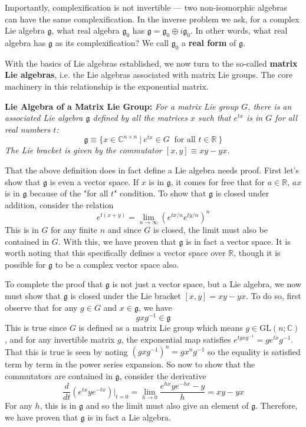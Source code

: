 \documentclass{article}
\renewcommand{\t}[1]{\text{#1}}
\newcommand{\definition}[2]{
	\begin{center}
		\begin{tcolorbox}[colframe=MidnightBlue, colback=black!5, arc=2mm, outer arc=0.5mm, width=\linewidth, left=2mm, right=2mm]
			\textbf{#1:} \emph{#2}	
		\end{tcolorbox}
	\end{center}\noindent}
\newcommand{\sidenote}[1]{
	\marginpar{\raggedright\small\textcolor{Bittersweet}{#1}}
}
\begin{document}
Importantly, complexification is not invertible --- two non-isomorphic algebras can have the same complexification. In the inverse problem we ask, for a complex Lie algebra $\mathfrak{g}$, what real algebra $\mathfrak{g}_0$ has $\mathfrak{g}=\mathfrak{g}_0 \oplus i\mathfrak{g}_0$. In other words, what real algebra has $\mathfrak{g}$ as its complexification? We call $\mathfrak{g}_0$ a \textbf{real form} of $\mathfrak{g}$. 
	

With\sidenote{\textbf{Lie Algebra of a Lie Group}} the basics of Lie algebras established, we now turn to the so-called \textbf{matrix Lie algebras}, i.e. the Lie algebras associated with matrix Lie groups. The core machinery in this relationship is the exponential matrix. 
\definition{Lie Algebra of a Matrix Lie Group}{For a matrix Lie group $G$, there is an associated Lie algebra $\mathfrak{g}$ defined by all the matrices $x$ such that $e^{tx}$ is in $G$ for all real numbers $t$:
$$ \mathfrak{g} \equiv \{ x\in \mathbb{C}^{n\times n} \:|\:e^{tx}\in G \: \t{ for all } t\in\mathbb{R}\:  \} $$
The Lie bracket is given by the commutator $ [x,y]\equiv xy-yx $.}
That the above definition does in fact define a Lie algebra needs proof. First let's show that $\mathfrak{g}$ is even a vector space. If $x$ is in $\mathfrak{g}$, it comes for free that for $a\in\mathbb{R}$, $ax$ is in $\mathfrak{g}$ because of the "for all $t$" condition. To show that $\mathfrak{g}$ is closed under addition, consider the relation
$$e^{t(x+y)}=\lim_{n\to\infty}(e^{tx/n}e^{ty/n})^n$$
This is in $G$ for any finite $n$ and since $G$ is closed, the limit must also be contained in $G$. With this, we have proven that $\mathfrak{g}$ is in fact a vector space. It is worth noting that this specifically defines a vector space over $\mathbb{R}$, though it is possible for $\mathfrak{g}$ to be a complex vector space also. 

To complete the proof that $\mathfrak{g}$ is not just a vector space, but a Lie algebra, we now must show that $\mathfrak{g}$ is closed under the Lie bracket $[x,y]=xy-yx$. To do so, first observe that for any $g\in G$ and $x\in\mathfrak{g}$, we have
$$ gxg^{-1}\in\mathfrak{g} $$
This is true since $G$ is defined as a matrix Lie group which means $g\in \t{GL}(n;\mathbb{C})$, and for any invertible matrix $g$, the exponential map satisfies $ e^{tgxg^{-1}}=ge^{tx}g^{-1} $. That this is true is seen by noting $(gxg^{-1})^n=gx^ng^{-1}$ so the equality is satisfied term by term in the power series expansion. So now to show that the commutators are contained in $\mathfrak{g}$, consider the derivative
$$ \frac{d}{dt}(e^{tx}ye^{-tx})\big|_{t=0} = \lim_{h\to 0} \frac{e^{hx}ye^{-hx} - y}{h} = xy - yx $$
For any $h$, this is in $\mathfrak{g}$ and so the limit must also give an element of $\mathfrak{g}$. Therefore, we have proven that $\mathfrak{g}$ is in fact a Lie algebra.
\end{document}
